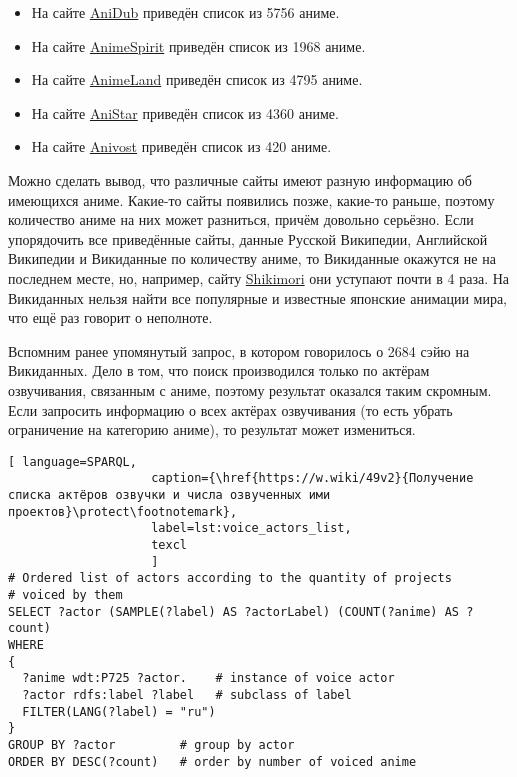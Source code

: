 \begin{itemize}
	\item На сайте \href{http://online.anidub.best/}{AniDub} приведён список из \num{5756} аниме.
	\item На сайте \href{http://animespirit.tv/}{AnimeSpirit} приведён список из \num{1968} аниме.
	\item На сайте \href{http://animeland.su/}{AnimeLand} приведён список из \num{4795} аниме.
	\item На сайте \href{https://anistar.ew.r.appspot.com/}{AniStar} приведён список из \num{4360} аниме.
	\item На сайте \href{https://anivost.org/}{Anivost} приведён список из \num{420} аниме.
\end{itemize}

Можно сделать вывод, что различные сайты имеют разную информацию об имеющихся аниме. Какие-то сайты появились позже, какие-то раньше, поэтому количество аниме на них может разниться, причём довольно серьёзно. Если упорядочить все приведённые сайты, данные Русской Википедии, Английской Википедии и Викиданные по количеству аниме, то Викиданные окажутся не на последнем месте, но, например, сайту \href{https://shikimori.one/}{Shikimori} они уступают почти в 4 раза. На Викиданных нельзя найти все популярные и известные японские анимации мира, что ещё раз говорит о неполноте.

Вспомним ранее упомянутый запрос, в котором говорилось о \num{2684} сэйю на Викиданных. Дело в том, что поиск производился только по актёрам озвучивания, связанным с аниме, поэтому результат оказался таким скромным. Если запросить информацию о всех актёрах озвучивания (то есть убрать ограничение на категорию аниме), то результат может измениться. 

\begin{lstlisting}[ language=SPARQL, 
                    caption={\href{https://w.wiki/49v2}{Получение списка актёров озвучки и числа озвученных ими проектов}\protect\footnotemark},
                    label=lst:voice_actors_list,
                    texcl 
                    ]
# Ordered list of actors according to the quantity of projects
# voiced by them
SELECT ?actor (SAMPLE(?label) AS ?actorLabel) (COUNT(?anime) AS ?count)
WHERE
{
  ?anime wdt:P725 ?actor.	 # instance of voice actor
  ?actor rdfs:label ?label	 # subclass of label
  FILTER(LANG(?label) = "ru")
}
GROUP BY ?actor		    # group by actor
ORDER BY DESC(?count)	# order by number of voiced anime
\end{lstlisting}%

